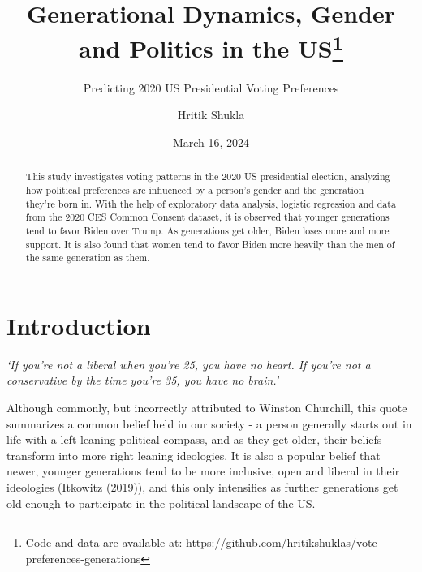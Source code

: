 \documentclass[
  letterpaper,
  DIV=11,
  numbers=noendperiod]{scrartcl}
\title{Generational Dynamics, Gender and Politics in the US\thanks{Code
and data are available at:
https://github.com/hritikshuklas/vote-preferences-generations}}
\subtitle{Predicting 2020 US Presidential Voting Preferences}
\author{Hritik Shukla}
\date{March 16, 2024}
\begin{document}
\maketitle
\begin{abstract}
This study investigates voting patterns in the 2020 US presidential
election, analyzing how political preferences are influenced by a
person's gender and the generation they're born in. With the help of
exploratory data analysis, logistic regression and data from the 2020
CES Common Consent dataset, it is observed that younger generations tend
to favor Biden over Trump. As generations get older, Biden loses more
and more support. It is also found that women tend to favor Biden more
heavily than the men of the same generation as them.
\end{abstract}
\ifdefined\Shaded\renewenvironment{Shaded}{\begin{tcolorbox}[boxrule=0pt, enhanced, interior hidden, frame hidden, borderline west={3pt}{0pt}{shadecolor}, breakable, sharp corners]}{\end{tcolorbox}}\fi

\hypertarget{sec-intro}{%
\section{Introduction}\label{sec-intro}}

\emph{`If you're not a liberal when you're 25, you have no heart. If
you're not a conservative by the time you're 35, you have no brain.'}

Although commonly, but incorrectly attributed to Winston Churchill, this
quote summarizes a common belief held in our society - a person
generally starts out in life with a left leaning political compass, and
as they get older, their beliefs transform into more right leaning
ideologies. It is also a popular belief that newer, younger generations
tend to be more inclusive, open and liberal in their ideologies
(Itkowitz (2019)), and this only intensifies as further generations get
old enough to participate in the political landscape of the US.
\end{document}
